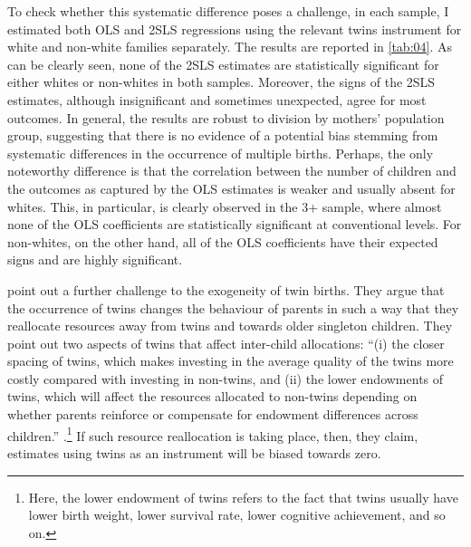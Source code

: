 To check whether this systematic difference poses a challenge, in each sample, I estimated both OLS and 2SLS regressions using the relevant twins instrument for white and non-white families separately. The results are reported in \autoref{tab:04}. As can be clearly seen, none of the 2SLS estimates are statistically significant for either whites or non-whites in both samples. Moreover, the signs of the 2SLS estimates, although insignificant and sometimes unexpected, agree for most outcomes. In general, the results are robust to division by mothers' population group, suggesting that there is no evidence of a potential bias stemming from systematic differences in the occurrence of multiple births. Perhaps, the only noteworthy difference is that the correlation between the number of children and the outcomes as captured by the OLS estimates is weaker and usually absent for whites. This, in particular, is clearly observed in the 3+ sample, where almost none of the OLS coefficients are statistically significant at conventional levels. For non-whites, on the other hand, all of the OLS coefficients have their expected signs and are highly significant. 

\textcite{rosenzweig_population_2009} point out a further challenge to the exogeneity of twin births. They argue that the occurrence of twins changes the behaviour of parents in such a way that they reallocate resources away from twins and towards older singleton children. They point out two aspects of twins that affect inter-child allocations: \enquote{(i) the closer spacing of twins, which makes investing in the average quality of the twins more costly compared with investing in non-twins, and (ii) the lower endowments of twins, which will affect the resources allocated to non-twins depending on whether parents reinforce or compensate for endowment differences across children.} \parencite[1152]{rosenzweig_population_2009}.\footnote{ Here, the lower endowment of twins refers to the fact that twins usually have lower birth weight, lower survival rate, lower cognitive achievement, and so on. } If such resource reallocation is taking place, then, they claim, estimates using twins as an instrument will be biased towards zero.

